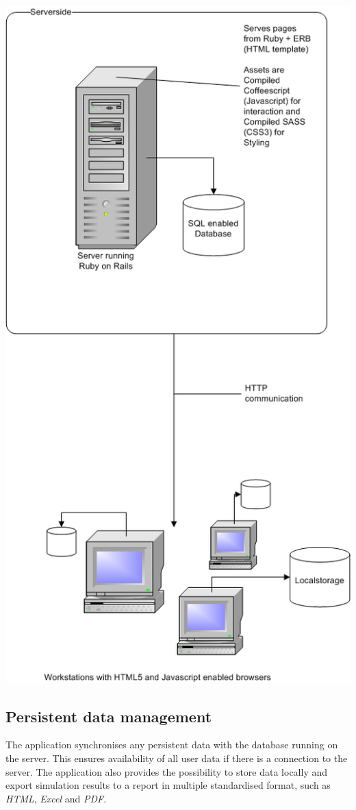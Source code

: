 \documentclass{report}
\begin{document}
			\includegraphics[width=16cm]{EAD.png}
		\subsection{Persistent data management}
			The application synchronises any persistent data with the database running on the server. This ensures availability of all user data if there is a connection to the server. The application also provides the possibility to store data locally and export simulation results to a report in multiple standardised format, such as \emph{HTML}, \emph{Excel} and \emph{PDF}.			
\end{document}
